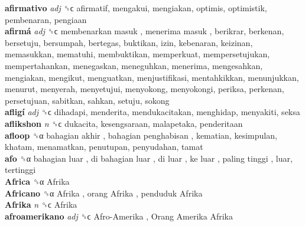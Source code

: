 \textbf{afirmativo} \emph{adj}  ␝ϲ  afirmatif, mengakui, mengiakan, optimis, optimistik, pembenaran, pengiaan  \\
\textbf{afirmá} \emph{adj}  ␝ϲ   membenarkan masuk ,  menerima masuk , berikrar, berkenan, bersetuju, bersumpah, bertegas, buktikan, izin, kebenaran, keizinan, memasukkan, mematuhi, membuktikan, memperkuat, mempersetujukan, mempertahankan, menegaskan, meneguhkan, menerima, mengesahkan, mengiakan, mengikut, menguatkan, menjustifikasi, mentahkikkan, menunjukkan, menurut, menyerah, menyetujui, menyokong, menyokongi, periksa, perkenan, persetujuan, sabitkan, sahkan, setuju, sokong  \\
\textbf{afligí} \emph{adj}  ␝ϲ  dihadapi, menderita, mendukacitakan, menghidap, menyakiti, seksa  \\
\textbf{aflikshon} \emph{n}  ␝ϲ  dukacita, kesengsaraan, malapetaka, penderitaan  \\
\textbf{afloop} ␝α   bahagian akhir ,  bahagian penghabisan , kematian, kesimpulan, khatam, menamatkan, penutupan, penyudahan, tamat  \\
\textbf{afo} ␝α   bahagian luar ,  di bahagian luar ,  di luar ,  ke luar ,  paling tinggi , luar, tertinggi  \\
\textbf{Africa} ␝α   Afrika   \\
\textbf{Africano} ␝α   Afrika ,  orang Afrika ,  penduduk Afrika   \\
\textbf{Afrika} \emph{n}  ␝ϲ   Afrika   \\
\textbf{afroamerikano} \emph{adj}  ␝ϲ   Afro-Amerika ,  Orang Amerika Afrika   \\
